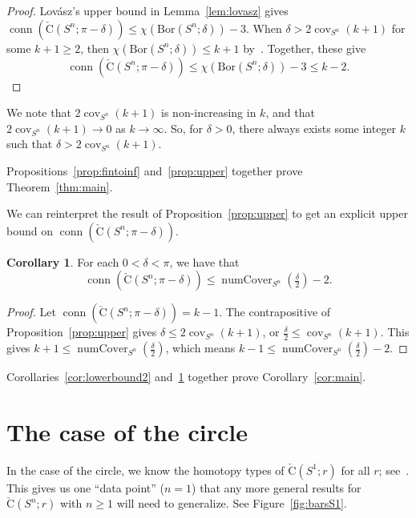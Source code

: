 \documentclass[11 pt,a4paper,twoside,reqno]{amsart}
\theoremstyle{definition}
\newtheorem{corollary}[theorem]{Corollary}
\newcommand{\cech}[2]{\mathrm{\check{C}}(#1;#2)}
\DeclareMathOperator{\conn}{conn}
\DeclareMathOperator{\cov}{cov}
\DeclareMathOperator{\numcov}{numCover}
\newcommand{\bor}[2]{\mathrm{Bor}(#1;#2)}
\begin{document}
\begin{proof}
Lov{\'a}sz's upper bound in Lemma~\ref{lem:lovasz} gives
$\conn(\cech{S^n}{\pi-\delta}) \le \chi(\bor{S^n}{\delta}) - 3$.
When $\delta > 2\cov_{S^n}(k+1)$ for some $k+1 \ge 2$, then $\chi(\bor{S^n}{\delta}) \le k+1$ by~\cite[Theorem 5.1.5]{MoyPhD}.
Together, these give
\[\conn(\cech{S^n}{\pi-\delta}) \le \chi(\bor{S^n}{\delta}) - 3 \le k-2.\]
\end{proof}

We note that $2\cov_{S^n}(k+1)$ is non-increasing in $k$, and that $2\cov_{S^n}(k+1)\to 0$ as $k\to \infty$.
So, for $\delta>0$, there always exists some integer $k$ such that $\delta>2\cov_{S^n}(k+1)$.

Propositions~\ref{prop:fintoinf} and~\ref{prop:upper} together prove Theorem~\ref{thm:main}.

We can reinterpret the result of Proposition~\ref{prop:upper} to get an explicit upper bound on $\conn(\cech{S^n}{\pi-\delta})$.

\begin{corollary}\label{cor:upperbound2}
For each $0<\delta <\pi$, we have that 
\[
\conn(\cech{S^n}{\pi-\delta})\le \numcov_{S^n}\left(\tfrac{\delta}{2}\right)-2.
\]
\end{corollary}

\begin{proof}
Let $\conn(\cech{S^n}{\pi-\delta})=k-1$.
The contrapositive of Proposition~\ref{prop:upper} gives $\delta\le 2\cov_{S^n}(k+1)$, or $\frac{\delta}{2}\le \cov_{S^n}(k+1)$.
This gives $k+1\le \numcov_{S^n}(\tfrac{\delta}{2})$, which means $k-1\le \numcov_{S^n}(\tfrac{\delta}{2})-2$.
\end{proof}

Corollaries~\ref{cor:lowerbound2} and~\ref{cor:upperbound2} together prove Corollary~\ref{cor:main}.



\section{The case of the circle}
\label{sec:circle}

In the case of the circle, we know the homotopy types of $\cech{S^1}{r}$ for all $r$; see~\cite[Section~9]{AA-VRS1}.
This gives us one ``data point'' ($n=1$) that any more general results for $\cech{S^n}{r}$ with $n\ge 1$ will need to generalize.
See Figure~\ref{fig:barsS1}.
\end{document}
